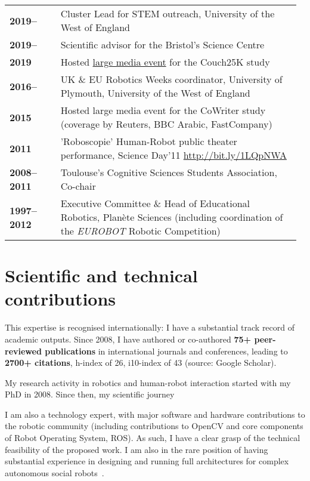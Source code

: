 \begin{tabular}{p{0.17\linewidth}p{0.8\linewidth}}

    \bf 2019--& Cluster Lead for STEM outreach, University of the West of England \\
    \bf 2019--& Scientific advisor for the Bristol's Science Centre \\
    \bf 2019 & Hosted \href{https://share.coveragebook.com/b/6d7defc7c4a49e93}{large media event} for the Couch25K study~\cite{winkle2020insitu} \\
    \bf 2016--& UK \& EU Robotics Weeks coordinator, University of Plymouth, University of the West of England \\
    \bf 2015 & Hosted large media event for the CoWriter study~\cite{lemaignan2016learning} (coverage by Reuters, BBC Arabic, FastCompany) \\
    \bf 2011& 'Roboscopie' Human-Robot public theater performance, Science Day'11 \url{http://bit.ly/1LQpNWA} \\
    \bf 2008--2011& Toulouse's Cognitive Sciences Students Association, Co-chair \\
    \bf 1997--2012& Executive Committee \& Head of Educational Robotics, Planète Sciences (including coordination of the \textit{EUROBOT} Robotic Competition) \\

\end{tabular}
\vspace{2em}


\section{Scientific and technical contributions}
\label{sci-contribs}

This expertise is recognised internationally: I have a substantial track record
of academic outputs. Since 2008, I have authored or co-authored \textbf{75+
peer-reviewed publications} in international journals and conferences, leading
to \textbf{2700+ citations}, h-index of 26, i10-index of 43 (source: Google
Scholar).



My research activity in robotics and human-robot interaction started with my PhD
in 2008. Since then, my scientific journey


I am also a technology expert, with major software and hardware contributions to
the robotic community (including contributions to OpenCV and core components of
Robot Operating System, ROS). As such, I have a clear grasp of the technical
feasibility of the proposed work. I am also in the rare position of having
substantial experience in designing and running full architectures for complex
autonomous social
robots~\cite{lemaignan2017artificial,winkle2020insitu}.



